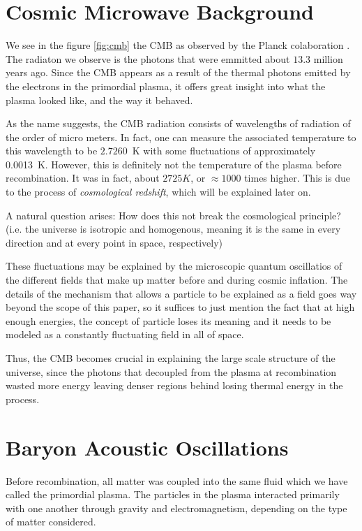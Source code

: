 \section{Cosmic Microwave Background}

We see in the figure \ref{fig:cmb} the CMB as observed by the Planck colaboration \cite{Collaboration2018}. The radiaton we observe is the photons that were emmitted about $13.3$ million years ago. Since the CMB appears as a result of the thermal photons emitted by the electrons in the primordial plasma, it offers great insight into what the plasma looked like, and the way it behaved. 

As the name suggests, the CMB radiation consists of wavelengths of radiation of the order of micro meters. In fact, one can measure the associated temperature to this wavelength to be $2.7260$\SI{}{K}\cite{Fixsen2009} with some fluctuations of approximately \SI{0.0013}{K}. However, this is definitely not the temperature of the plasma before recombination. It was in fact, about $2725K$, or $\approx 1000$ times higher. This is due to the process of \textit{cosmological redshift}, which will be explained later on.

A natural question arises: How does this not break the cosmological principle? (i.e. the universe is isotropic and homogenous, meaning it is the same in every direction and at every point in space, respectively)
	
These fluctuations may be explained by the microscopic quantum oscillatios of the different fields that make up matter before and during cosmic inflation. The details of the mechanism that allows a particle to be explained as a field goes way beyond the scope of this paper, so it suffices to just mention the fact that at high enough energies, the concept of particle loses its meaning and it needs to be modeled as a constantly fluctuating field in all of space.

Thus, the CMB becomes crucial in explaining the large scale structure of the universe, since the photons that decoupled from the plasma at recombination wasted more energy leaving denser regions behind losing thermal energy in the process. 

\section{Baryon Acoustic Oscillations}

Before recombination, all matter was coupled into the same fluid which we have called the primordial plasma. The particles in the plasma interacted primarily with one another through gravity and electromagnetism, depending on the type of matter considered. 

